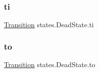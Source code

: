 \subsubsection{\texorpdfstring{ti}{ti}}
{\footnotesize\ttfamily \mbox{\hyperlink{interfaceorg_1_1newdawn_1_1slick_1_1state_1_1transition_1_1_transition}{Transition}} states.\+Dead\+State.\+ti\hspace{0.3cm}{\ttfamily [private]}}

\mbox{\label{classstates_1_1_dead_state_abd0a826acb872d9a3ed0d92aa2f82a22}} 
\subsubsection{\texorpdfstring{to}{to}}
{\footnotesize\ttfamily \mbox{\hyperlink{interfaceorg_1_1newdawn_1_1slick_1_1state_1_1transition_1_1_transition}{Transition}} states.\+Dead\+State.\+to\hspace{0.3cm}{\ttfamily [private]}}

